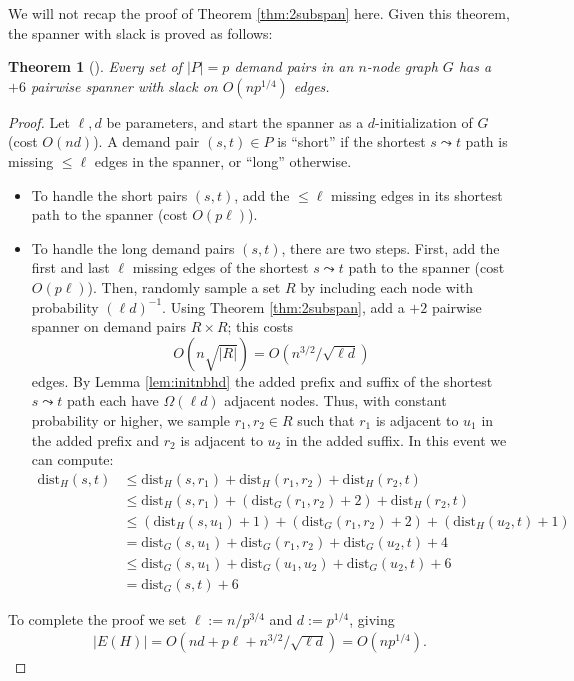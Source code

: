\documentclass{article}
\newtheorem{theorem}{Theorem}
\newcommand{\dist}{\text{dist}}
\begin{document}
We will not recap the proof of Theorem \ref{thm:2subspan} here.
Given this theorem, the spanner with slack is proved as follows:
\begin{theorem} [\cite{Kavitha17}]
Every set of $|P| = p$ demand pairs in an $n$-node graph $G$ has a $+6$ pairwise spanner with slack on $O(np^{1/4})$ edges.
\end{theorem}
\begin{proof}
Let $\ell, d$ be parameters, and start the spanner as a $d$-initialization of $G$ (cost $O(nd)$).
A demand pair $(s, t) \in P$ is ``short'' if the shortest $s \leadsto t$ path is missing $\le \ell$ edges in the spanner, or ``long'' otherwise.
\begin{itemize}
\item To handle the short pairs $(s, t)$, add the $\le \ell$ missing edges in its shortest path to the spanner (cost $O(p \ell)$).

\item To handle the long demand pairs $(s, t)$, there are two steps.
First, add the first and last $\ell$ missing edges of the shortest $s \leadsto t$ path to the spanner (cost $O(p \ell)$).
Then, randomly sample a set $R$ by including each node with probability $(\ell d)^{-1}$.
Using Theorem \ref{thm:2subspan}, add a $+2$ pairwise spanner on demand pairs $R \times R$; this costs
$$O\left(n \sqrt{|R|}\right) = O\left(n^{3/2} / \sqrt{\ell d}\right)$$
edges.
By Lemma \ref{lem:initnbhd} the added prefix and suffix of the shortest $s \leadsto t$ path each have $\Omega(\ell d)$ adjacent nodes.
Thus, with constant probability or higher, we sample $r_1, r_2 \in R$ such that $r_1$ is adjacent to $u_1$ in the added prefix and $r_2$ is adjacent to $u_2$ in the added suffix.
In this event we can compute:
\begin{align*}
\dist_H(s, t) &\le \dist_H(s, r_1) + \dist_H(r_1, r_2) + \dist_H(r_2, t) \tag*{triangle inequality}\\
&\le \dist_H(s, r_1) + (\dist_G(r_1, r_2) + 2) + \dist_H(r_2, t) \tag*{$R \times R$ $+2$ pairwise spanner}\\
&\le (\dist_H(s, u_1) + 1) + (\dist_G(r_1, r_2) + 2) + (\dist_H(u_2, t) + 1) \tag*{triange inequality}\\
&= \dist_G(s, u_1) + \dist_G(r_1, r_2) + \dist_G(u_2, t) + 4 \tag*{added prefix/suffix}\\
&\le \dist_G(s, u_1) + \dist_G(u_1, u_2) + \dist_G(u_2, t) + 6 \tag*{triangle inequality}\\
&= \dist_G(s, t) + 6 \tag*{$u_1, u_2$ on $s \leadsto t$ shortest path.}
\end{align*} 
\end{itemize}
To complete the proof we set $\ell := n/p^{3/4}$ and $d := p^{1/4}$, giving
\begin{align*}
|E(H)| = O\left(nd + p\ell + n^{3/2}/\sqrt{\ell d} \right) = O\left( np^{1/4} \right). \tag*{\qedhere}
\end{align*}
\end{proof}
\end{document}
